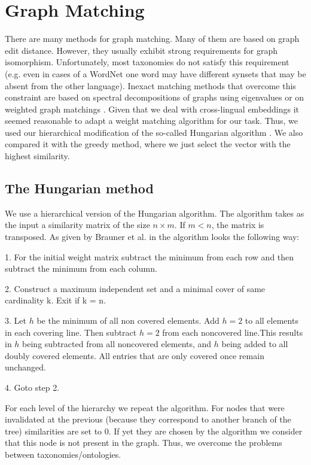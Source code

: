 \documentclass[11pt,a4paper]{article}
\begin{document}
\section{Graph Matching}
There are many methods for graph matching. Many of them are based on graph edit distance. However, they usually exhibit strong requirements for graph isomorphism. Unfortunately, most taxonomies do not satisfy this requirement (e.g. even in cases of a WordNet one word may have different synsets that may be absent from the other language). Inexact matching methods that overcome this constraint are based on spectral decompositions of graphs using eigenvalues or on weighted graph matchings \cite{30years-graphs}. Given that we deal with cross-lingual embeddings it seemed reasonable to adapt a weight matching algorithm for our task. Thus, we used our hierarchical modification of the so-called Hungarian algorithm \cite[p.~201]{lawler} \cite[p.~48]{Riesen2010}. We also compared it with the greedy method, where we just select the vector with the highest similarity.
\subsection{The Hungarian method}
We use a hierarchical version of the Hungarian algorithm. The algorithm takes as the input a similarity matrix of the size $n \times m$. If $m < n$, the matrix is transposed. As given by Brauner et al. in \citeyear{hungarian-listing} the algorithm looks the following way:

1. For the initial weight matrix subtract the minimum from each row and then subtract the minimum from each column.

2. Construct a maximum independent set and a minimal cover of same cardinality k. Exit if k = n.

3. Let $h$ be the minimum of all non covered elements. Add $h=2$ to all elements in each covering line. Then subtract $h=2$ from each noncovered line.This results in $h$ being subtracted from all noncovered elements, and $h$ being added to all doubly covered elements. All entries that are only covered once remain unchanged.

4. Goto step 2.

For each level of the hierarchy we repeat the algorithm. For nodes that were invalidated at the previous (because they correspond to another branch of the tree) similarities are set to 0. If yet they are chosen by the algorithm we consider that this node is not present in the graph. Thus, we overcome the problems between taxonomies/ontologies.
%
\end{document}
